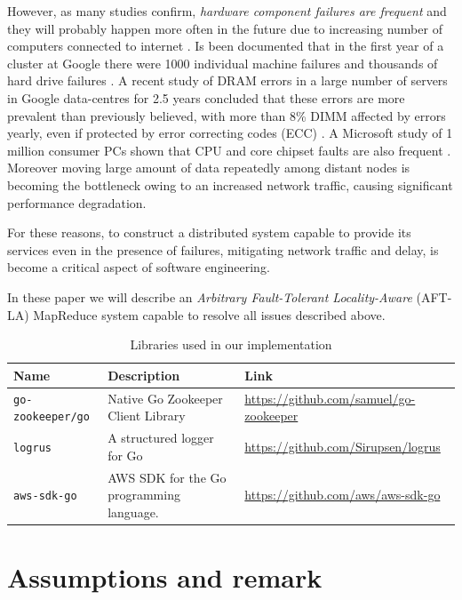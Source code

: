 \documentclass[sigchi]{acmart}
\begin{document}
However, as many studies confirm, \textit{hardware component failures are frequent} and they will probably happen more often in the future due to increasing number of computers connected to internet \citep{BFLMapReduce}. Is been documented that in the first year of a cluster at Google there were 1000 individual machine failures and thousands of hard drive failures \cite{PetaScaleFailure}. A recent study of DRAM errors in a large number of servers in Google data-centres for 2.5 years concluded that these errors are more prevalent than previously believed, with more than 8\% DIMM affected by errors yearly, even if protected by error correcting codes (ECC) \cite{DRAMError}. A Microsoft study of 1 million consumer PCs shown that CPU and core chipset faults are also frequent \cite{MicrosoftStudyFailure}. Moreover moving large amount of data repeatedly among distant nodes is becoming the bottleneck owing to an increased network traffic, causing significant performance degradation.

For these reasons, to construct a distributed system capable to provide its services even in the presence of failures, mitigating network traffic and delay, is become a critical aspect of software engineering.

In these paper we will describe an \textit{Arbitrary Fault-Tolerant Locality-Aware} (AFT-LA) MapReduce system capable to resolve all issues described above. 

\begin{table}
  \caption{Libraries used in our implementation}
  \label{tab:libraries}
  \begin{tabular}{l|l|l}
    \toprule
    Name & Description & Link \\
    \midrule
    \texttt{go-zookeeper/go} & Native Go Zookeeper Client Library & \url{https://github.com/samuel/go-zookeeper} \\
    \texttt{logrus} & A structured logger for Go & \url{https://github.com/Sirupsen/logrus} \\
    \texttt{aws-sdk-go} & AWS SDK for the Go programming language. & \url{https://github.com/aws/aws-sdk-go} \\
    \bottomrule
  \end{tabular}
\end{table}

\section{Assumptions and remark}
\end{document}
